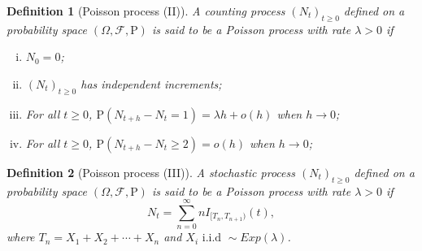 \documentclass{article}
\newtheorem{definition}{Definition}[section]
\theoremstyle{nonumberplain}
\begin{document}
\begin{definition}[Poisson process (II)]
	A counting process $(N_t)_{t\ge0}$ defined on a probability space $(\Omega,\mathcal{F},\mathrm{P})$ is said to be a \emph{Poisson process} with rate $\lambda>0$ if
	\begin{enumerate}[(i)]
		\item $N_0=0$;
		\item $(N_t)_{t\ge0}$ has independent increments;
		\item For all $t\ge0$, $\mathrm{P}(N_{t+h}-N_t=1)=\lambda h+o(h)$ when $h\to0$;
		\item For all $t\ge0$, $\mathrm{P}(N_{t+h}-N_t\ge2)=o(h)$ when $h\to0$;
	\end{enumerate}	
\end{definition}

\begin{definition}[Poisson process (III)]
	A stochastic process $(N_t)_{t\ge0}$ defined on a probability space $(\Omega,\mathcal{F},\mathrm{P})$ is said to be a \emph{Poisson process} with rate $\lambda>0$ if
	\[
	N_t=\sum_{n=0}^{\infty}nI_{[T_n,T_{n+1})}(t),
	\]
	where $T_n=X_1+X_2+\cdots+X_n$ and $X_i\text{ i.i.d }\sim Exp(\lambda)$.
\end{definition}
\end{document}
